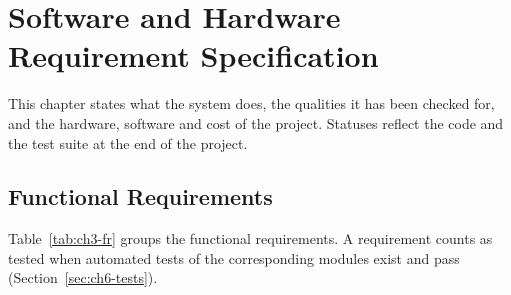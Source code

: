 \chapter{Software and Hardware Requirement Specification}\label{ch:requirements}

This chapter states what the system does, the qualities it has been checked for, and the hardware, software and cost of the project. Statuses reflect the code and the test suite at the end of the project.

\section{Functional Requirements}
Table~\ref{tab:ch3-fr} groups the functional requirements. A requirement counts as tested when automated tests of the corresponding modules exist and pass (Section~\ref{sec:ch6-tests}).

